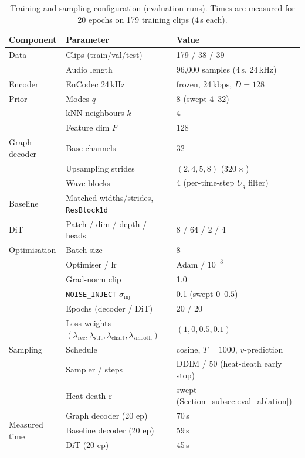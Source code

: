 \documentclass[12pt,a4paper]{article}
\begin{document}
\begin{table}[h]
\centering
\caption{Training and sampling configuration (evaluation runs). Times
are measured for 20 epochs on 179 training clips (4\,s each).}
\begin{tabular}{lll}
\toprule
Component & Parameter & Value \\
\midrule
Data & Clips (train/val/test) & 179 / 38 / 39 \\
     & Audio length & 96{,}000 samples (4\,s, 24\,kHz) \\
\midrule
Encoder & EnCodec 24\,kHz & frozen, 24\,kbps, $D{=}128$ \\
\midrule
Prior & Modes $q$ & 8 (swept $4$--$32$) \\
      & kNN neighbours $k$ & 4 \\
      & Feature dim $F$ & 128 \\
\midrule
Graph decoder & Base channels & 32 \\
      & Upsampling strides & $(2,4,5,8)$ ($320\times$) \\
      & Wave blocks & 4 (per-time-step $U_q$ filter) \\
Baseline & Matched widths/strides, \texttt{ResBlock1d} \\
\midrule
DiT & Patch / dim / depth / heads & 8 / 64 / 2 / 4 \\
\midrule
Optimisation & Batch size & 8 \\
      & Optimiser / lr & Adam / $10^{-3}$ \\
      & Grad-norm clip & 1.0 \\
      & \texttt{NOISE\_INJECT} $\sigma_{\mathrm{inj}}$ & 0.1 (swept $0$--$0.5$) \\
      & Epochs (decoder / DiT) & 20 / 20 \\
      & Loss weights $(\lambda_{\mathrm{rec}},\lambda_{\mathrm{stft}},\lambda_{\mathrm{chart}},\lambda_{\mathrm{smooth}})$ & $(1, 0, 0.5, 0.1)$ \\
\midrule
Sampling & Schedule & cosine, $T{=}1000$, $v$-prediction \\
      & Sampler / steps & DDIM / 50 (heat-death early stop) \\
      & Heat-death $\varepsilon$ & swept (Section~\ref{subsec:eval_ablation}) \\
\midrule
\multirow{3}{*}{Measured time} & Graph decoder (20 ep) & 70\,s \\
      & Baseline decoder (20 ep) & 59\,s \\
      & DiT (20 ep) & 45\,s \\
\bottomrule
\end{tabular}
\label{tab:hyperparams}
\end{table}
\end{document}
